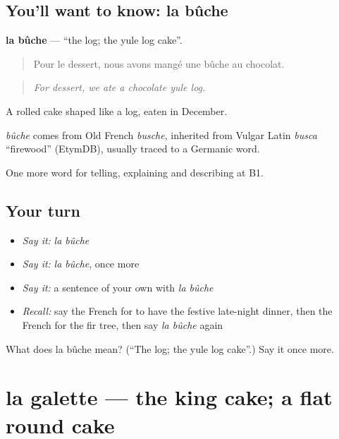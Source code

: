\subsection*{You'll want to know: la bûche}
\textbf{la bûche} — \textquotedblleft{}the log; the yule log cake\textquotedblright{}.

\begin{quote}
Pour le dessert, nous avons mangé une bûche au chocolat.
\end{quote}

\begin{quote}
\emph{For dessert, we ate a chocolate yule log.}
\end{quote}

A rolled cake shaped like a log, eaten in December.

\begin{cousinweb}
\emph{bûche} comes from Old French \emph{busche}, inherited from Vulgar Latin \emph{busca} \textquotedblleft{}firewood\textquotedblright{} (EtymDB), usually traced to a Germanic word.
\end{cousinweb}

\begin{grammarlens}[title={What you've built}]
One more word for telling, explaining and describing at B1.
\end{grammarlens}

\subsection*{Your turn}
\begin{itemize}
\raggedright
  \item \emph{Say it:} \emph{la bûche}
  \item \emph{Say it:} \emph{la bûche}, once more
  \item \emph{Say it:} a sentence of your own with \emph{la bûche}
  \item \emph{Recall:} say the French for to have the festive late-night dinner, then the French for the fir tree, then say \emph{la bûche} again
\end{itemize}

\begin{tcolorbox}[breakable,colback=teal!4,colframe=teal!35!black,title={Before you move on}]
What does la bûche mean? (\textquotedblleft{}The log; the yule log cake\textquotedblright{}.) Say it once more.
\end{tcolorbox}
\section[la galette]{la galette — the king cake; a flat round cake}

